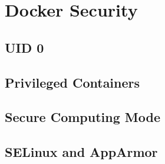 \section{Docker Security}
\label{sec::security}


\subsection{UID 0}
\label{ssec::security:uid0}

\subsection{Privileged Containers}
\label{ssec::security:priv-cont}

\subsection{Secure Computing Mode}
\label{ssec::security:sec-compt}

\subsection{SELinux and AppArmor}
\label{ssec::security:sel-apparm}

